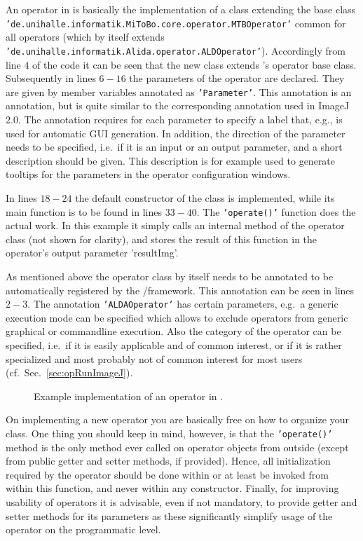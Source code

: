 An operator in \mitobo is basically the implementation of a class extending the base class 
{\tt 'de.unihalle.informatik.MiToBo.core.operator.MTBOperator'} common for all operators (which 
by itself extends {\tt 'de.unihalle.informatik.Alida.operator.ALDOperator'}). Accordingly
from line $4$ of the code it can be seen that the new class extends \mitobo's operator base 
class. Subsequently in lines $6-16$ the parameters of the operator are declared. They are given by 
member variables annotated as {\tt 'Parameter'}. This annotation is an \alida annotation, but 
is quite similar to the corresponding annotation used in ImageJ $2.0$. The annotation requires 
for each parameter to specify a label that, e.g., is used for automatic GUI generation. In addition,
the direction of the parameter needs to be specified, i.e.~if it is an input or an output parameter,
and a short description should be given. This description is for example used to generate tooltips 
for the parameters in the operator configuration windows. 

In lines $18-24$ the default constructor of the class is implemented, while its main function is
to be found in lines $33-40$. The {\tt 'operate()'} function does the actual work. In this example 
it simply calls an internal method of the operator class (not shown for clarity), and stores the 
result of this function in the operator's output parameter 'resultImg'.

As mentioned above the operator class by itself needs to be annotated to be automatically 
registered by the \alida/\mitobo framework. This annotation can be seen in lines $2-3$. The 
annotation {\tt 'ALDAOperator'} has certain parameters, e.g.~a generic execution mode can be 
specified which allows to exclude operators from generic graphical or commandline execution. 
Also the category of the operator can be specified, i.e.~if it is easily applicable and of common 
interest, or if it is rather specialized and most probably not of common interest for most users
(cf.~Sec.~\ref{sec:opRunImageJ}).   
 \begin{figure*}[htbp]
\centering

\caption[Implementation example for a standard
ImageJ plugin]{\label{exa:opExample}Example implementation of an operator in \mitobo.}
\end{figure*}

On implementing a new operator you are basically free on how to organize your class. One thing 
you should keep in mind, however, is that the {\tt 'operate()'} method is the only method ever 
called on operator objects from outside (except from public getter and setter methods, if provided). 
Hence, all initialization required by the 
operator should be done within or at least be invoked from within this function, and never 
within any constructor. Finally, for improving usability of operators it is advisable,
even if not mandatory, to provide getter and setter methods for its parameters as these 
significantly simplify usage of the operator on the programmatic level.
